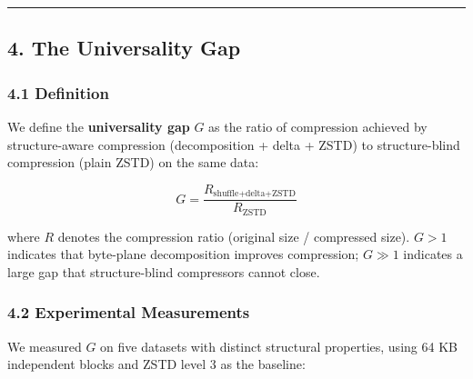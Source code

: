 \documentclass[
  11pt,
  letterpaper,
]{article}
\makeatletter
\renewcommand{\_}{\bpd@origunderscore\allowbreak}
\makeatother
\begin{document}
\begin{center}\rule{0.5\linewidth}{0.5pt}\end{center}

\hypertarget{the-universality-gap}{%
\subsection{4. The Universality Gap}\label{the-universality-gap}}

\hypertarget{definition}{%
\subsubsection{4.1 Definition}\label{definition}}

We define the \textbf{universality gap} \(G\) as the ratio of
compression achieved by structure-aware compression (decomposition +
delta + ZSTD) to structure-blind compression (plain ZSTD) on the same
data:

\[G = \frac{R_{\text{shuffle+delta+ZSTD}}}{R_{\text{ZSTD}}}\]

where \(R\) denotes the compression ratio (original size / compressed
size). \(G > 1\) indicates that byte-plane decomposition improves
compression; \(G \gg 1\) indicates a large gap that structure-blind
compressors cannot close.

\hypertarget{experimental-measurements}{%
\subsubsection{4.2 Experimental
Measurements}\label{experimental-measurements}}

We measured \(G\) on five datasets with distinct structural properties,
using 64 KB independent blocks and ZSTD level 3 as the baseline:
\end{document}
